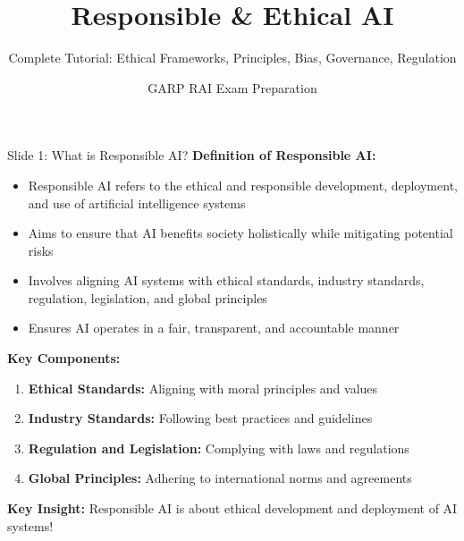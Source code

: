 \documentclass[8pt]{beamer}
\title{Responsible \& Ethical AI}
\subtitle{Complete Tutorial: Ethical Frameworks, Principles, Bias, Governance, Regulation}
\author{GARP RAI Exam Preparation}
\date{}
\begin{document}
	
	\begin{frame}
		\titlepage
	\end{frame}
	
	
	\begin{frame}{Slide 1: What is Responsible AI?}
		\fontsize{6.5}{7.5}\selectfont
		\textbf{Definition of Responsible AI:}
		\begin{itemize}
			\item Responsible AI refers to the ethical and responsible development, deployment, and use of artificial intelligence systems
			\item Aims to ensure that AI benefits society holistically while mitigating potential risks
			\item Involves aligning AI systems with ethical standards, industry standards, regulation, legislation, and global principles
			\item Ensures AI operates in a fair, transparent, and accountable manner
		\end{itemize}
		
		\vspace{0.1cm}
		\textbf{Key Components:}
		\begin{enumerate}
			\item \textbf{Ethical Standards:} Aligning with moral principles and values
			\item \textbf{Industry Standards:} Following best practices and guidelines
			\item \textbf{Regulation and Legislation:} Complying with laws and regulations
			\item \textbf{Global Principles:} Adhering to international norms and agreements
		\end{enumerate}
		
		\textcolor{myblue}{\textbf{Key Insight:}} Responsible AI is about \textcolor{myblue}{ethical development and deployment} of AI systems!
	\end{frame}
	
\end{document}
